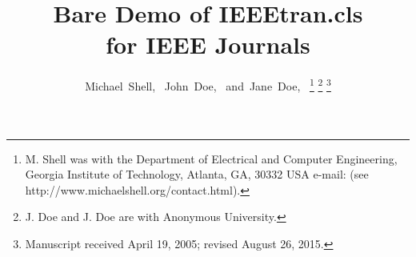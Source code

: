 \documentclass[journal]{IEEEtran}
\begin{document}
%
\title{Bare Demo of IEEEtran.cls\\ for IEEE Journals}
%
%
%

\author{Michael~Shell,~
        John~Doe,~
        and~Jane~Doe,~%
\thanks{M. Shell was with the Department
of Electrical and Computer Engineering, Georgia Institute of Technology, Atlanta,
GA, 30332 USA e-mail: (see http://www.michaelshell.org/contact.html).}%
\thanks{J. Doe and J. Doe are with Anonymous University.}%
\thanks{Manuscript received April 19, 2005; revised August 26, 2015.}}

% 
%
\end{document}
